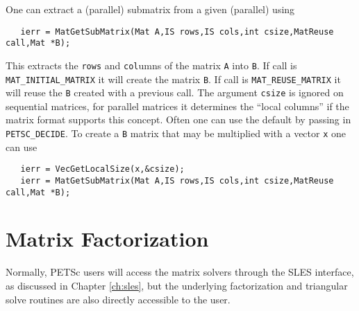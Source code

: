 {One can extract a (parallel) submatrix from a given (parallel) using
\begin{verbatim}
   ierr = MatGetSubMatrix(Mat A,IS rows,IS cols,int csize,MatReuse call,Mat *B);
\end{verbatim}
This extracts the {\tt rows} and {\tt col}umns of the matrix {\tt A} into {\tt B}. If 
call is  {\tt MAT\_INITIAL\_MATRIX}  it will create the matrix
{\tt B}. If call is {\tt MAT\_REUSE\_MATRIX}  it will reuse the {\tt B}
created with a previous call.  The argument {\tt csize} is ignored 
on sequential matrices, for parallel matrices it determines the ``local columns'' if the matrix
format supports this concept. Often one can use the default by passing in {\tt PETSC\_DECIDE}.
To create a {\tt B} matrix that may be multiplied with a vector {\tt x} one can use
\begin{verbatim}
   ierr = VecGetLocalSize(x,&csize);
   ierr = MatGetSubMatrix(Mat A,IS rows,IS cols,int csize,MatReuse call,Mat *B);
\end{verbatim}


\medskip \medskip

\section{Matrix Factorization} 
\label{sec:matfactor}

Normally, PETSc users will access the matrix solvers through the 
SLES interface, as discussed in Chapter \ref{ch:sles}, but the underlying 
factorization and triangular solve routines are also directly 
accessible to the user.

\medskip \medskip

}
